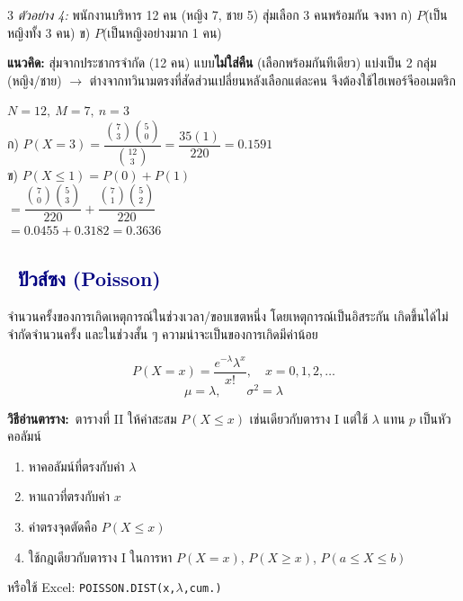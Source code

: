 \documentclass[9pt]{extarticle}
\newcommand{\dist}[1]{\subsection*{\textcolor{navy}{\textbullet\ #1}}}
\newcommand{\howto}{\textbf{\textcolor{navy!70!black}{วิธีอ่านตาราง:}}\ }
\begin{document}
\begin{multicols}{3}
\textit{ตัวอย่าง 4:} พนักงานบริหาร 12 คน (หญิง 7, ชาย 5) สุ่มเลือก 3 คนพร้อมกัน จงหา ก) $P$(เป็นหญิงทั้ง 3 คน) ข) $P$(เป็นหญิงอย่างมาก 1 คน)
\begin{ideabox}
\textbf{แนวคิด:} สุ่มจาก\allowbreak ประชากรจำกัด (12 คน) แบบ\allowbreak \textbf{ไม่ใส่คืน} (เลือก\allowbreak พร้อมกันทีเดียว) แบ่งเป็น 2 กลุ่ม (หญิง/ชาย) $\to$ ต่างจาก\allowbreak ทวินามตรงที่\allowbreak สัดส่วนเปลี่ยน\allowbreak หลังเลือกแต่ละ\allowbreak คน จึงต้องใช้\allowbreak ไฮเพอร์จีออเมตริก
\end{ideabox}
\begin{solbox}
$N{=}12,\ M{=}7,\ n{=}3$\\
ก) $P(X{=}3)=\dfrac{\binom{7}{3}\binom{5}{0}}{\binom{12}{3}}=\dfrac{35(1)}{220}=0.1591$\\
ข) $P(X\le1)=P(0)+P(1)$\\
$=\dfrac{\binom{7}{0}\binom{5}{3}}{220}+\dfrac{\binom{7}{1}\binom{5}{2}}{220}$\\
$=0.0455+0.3182=0.3636$
\end{solbox}

\begin{center}
\end{center}

\columnbreak
\dist{ปัวส์ซง (Poisson)}
จำนวนครั้งของ\allowbreak การเกิดเหตุการณ์\allowbreak ในช่วงเวลา/\allowbreak ขอบเขตหนึ่ง โดยเหตุการณ์\allowbreak เป็นอิสระกัน เกิดขึ้นได้\allowbreak ไม่จำกัดจำนวนครั้ง และในช่วงสั้น ๆ ความน่าจะเป็น\allowbreak ของการเกิด\allowbreak มีค่าน้อย
\begin{formulabox}
$$P(X{=}x)=\dfrac{e^{-\lambda}\lambda^x}{x!},\quad x=0,1,2,\dots$$
$$\mu = \lambda, \qquad \sigma^2 = \lambda$$
\end{formulabox}

\howto ตารางที่ II ให้ค่าสะสม $P(X\le x)$ เช่นเดียวกับตาราง I แต่ใช้ $\lambda$ แทน $p$ เป็นหัวคอลัมน์
\begin{enumerate}
\item หาคอลัมน์ที่ตรงกับค่า $\lambda$
\item หาแถวที่ตรงกับค่า $x$
\item ค่าตรงจุดตัดคือ $P(X\le x)$
\item ใช้กฎเดียวกับตาราง I ในการหา $P(X{=}x)$, $P(X\ge x)$, $P(a\le X\le b)$
\end{enumerate}
หรือใช้ Excel: \texttt{POISSON.DIST}\allowbreak\texttt{(x,$\lambda$,cum.)}


\end{multicols}
\end{document}

